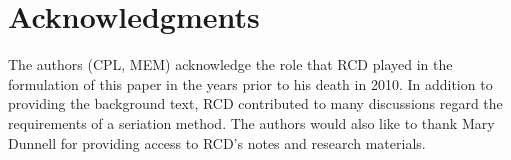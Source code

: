 \documentclass[10pt,letterpaper]{article}
\begin{document}
\section*{Acknowledgments}
The authors (CPL, MEM) acknowledge the role that RCD played in the formulation of this paper in the years prior to his death in 2010. In addition to providing the background text, RCD contributed to many discussions regard the requirements of a seriation method. The authors would also like to thank Mary Dunnell for providing access to RCD’s notes and research materials. 

\nolinenumbers
\clearpage
%
%
% 
\end{document}
